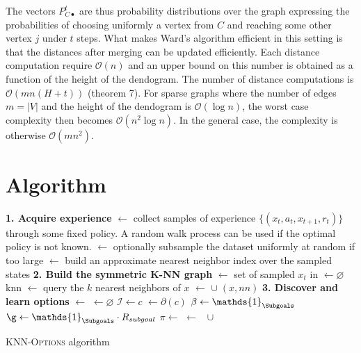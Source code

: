 \documentclass[12pt, oneside, extrafontsizes]{memoir}  %
\def\indicator{\mathds{1}}
\theoremstyle{plain}
\theoremstyle{definition}
\begin{document}
The vectors $P^t_{C\bullet}$ are thus probability distributions over the graph expressing the probabilities of choosing uniformly a vertex from $C$ and reaching some other vertex $j$ under $t$ steps. What makes Ward's algorithm efficient in this setting is that the distances after merging can be updated efficiently. Each distance computation require $\mathcal{O}(n)$ and an upper bound on this number is obtained as a function of the height of the dendogram. The number of distance computations is $\mathcal{O}(mn(H + t))$ \cite{Pons2005} (theorem 7). For sparse graphs where the number of edges $m = |V|$ and the height of the dendogram is $\mathcal{O}(\log n)$, the worst case complexity then becomes $\mathcal{O}(n^2 \log n)$. In the general case, the complexity is otherwise $\mathcal{O}(mn^2)$. 

\section{Algorithm}
\begin{algorithm}
\DontPrintSemicolon
{}
\;

\textbf{1. Acquire experience} \;
\Dataset $\leftarrow$ collect samples of experience $\{(x_t, a_t, x_{t+1}, r_{t})\}$ through some fixed policy. A random walk process can be used if the optimal policy is not known. \;
\Dataset $\leftarrow$ optionally subsample the dataset uniformly at random if too large\;
\Index $\leftarrow$ build an approximate nearest neighbor index over the sampled states\;
\;
\textbf{2. Build the symmetric K-NN graph}\;
\Vertices $\leftarrow $ set of sampled $x_t$ in \Dataset \;
\Edges $\leftarrow \varnothing$\;
 {
knn $\leftarrow$ query the $k$ nearest neighbors of $x$\;
   {
     {
    \Edges $\leftarrow$ \Edges $\cup \; (x, nn)$
    }
  }
}
\;
\textbf{3. Discover and learn options} \;
\Communities $\leftarrow$  \;
\Options $\leftarrow \varnothing$ \;
 {
  $\mathcal{I} \leftarrow c$\;
  \Subgoals $\leftarrow \partial(c)$\;
  $\beta \leftarrow \indicator_{\Subgoals}$ \;
   $\g \leftarrow \indicator_{\Subgoals}\cdot R_{subgoal}$\;
   $\pi \leftarrow$ \LearnMDP{\g} \;
   \Options $\leftarrow$ \Options $\; \cup \;$  \;
}
\Return \Options
\caption{\textsc{KNN-Options} algorithm}
\label{alg:knnoptions}
\end{algorithm}
\end{document}
